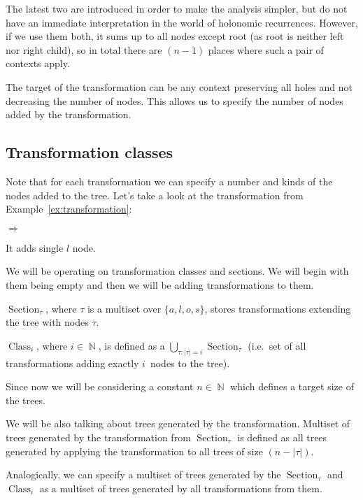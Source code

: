 \documentclass[final]{article}
\theoremstyle{definition}
\theoremstyle{definition}
\theoremstyle{remark}
\DeclareMathOperator{\N}{\mathbb{N}}
\DeclareMathOperator{\tClass}{\text{Class}}
\DeclareMathOperator{\tSection}{\text{Section}}
\newcommand{\includeinlinescaledsvg}[3]{\begin{minipage}{#1\textwidth}\begin{center}\end{center}\end{minipage}}
\begin{document}
The latest two are introduced in order to make the analysis simpler, but do not have an immediate interpretation in the world of holonomic recurrences. However, if we use them both, it sums up to all nodes except root (as root is neither left nor right child), so in total there are \((n - 1)\) places where such a pair of contexts apply.

The target of the transformation can be any context preserving all holes and not decreasing the number of nodes. This allows us to specify the number of nodes added by the transformation.

\subsection{Transformation classes}%
\label{sub:transformation_classes}

Note that for each transformation we can specify a number and kinds of the nodes added to the tree. Let's take a look at the transformation from Example~\ref{ex:transformation}:
\begin{center}
    \includeinlinescaledsvg{.4}{.7}{lambda__contexts__def_001}%
    \(\Rightarrow\)
    \includeinlinescaledsvg{.4}{.7}{lambda__contexts__def_002_with_l}%
\end{center}
It adds single \(l\) node.

We will be operating on transformation classes and sections. We will begin with them being empty and then we will be adding transformations to them.

\(\tSection_\tau\), where \(\tau\) is a multiset over \(\{a, l, o, s\}\), stores transformations extending the tree with nodes \(\tau\).

\(\tClass_i\), where \(i \in \N\), is defined as a \(\bigcup_{\tau : |\tau| = i} \tSection_\tau\) (i.e.~set of all transformations adding exactly \(i\)~nodes to the tree).

Since now we will be considering a constant \(n \in \N\) which defines a target size of the trees.

We will be also talking about trees generated by the transformation. Multiset of trees generated by the transformation from \(\tSection_\tau\) is defined as all trees generated by applying the transformation to all trees of size \((n - |\tau|)\).

Analogically, we can specify a multiset of trees generated by the \(\tSection_\tau\) and \(\tClass_i\) as a multiset of trees generated by all transformations from them.
\end{document}
